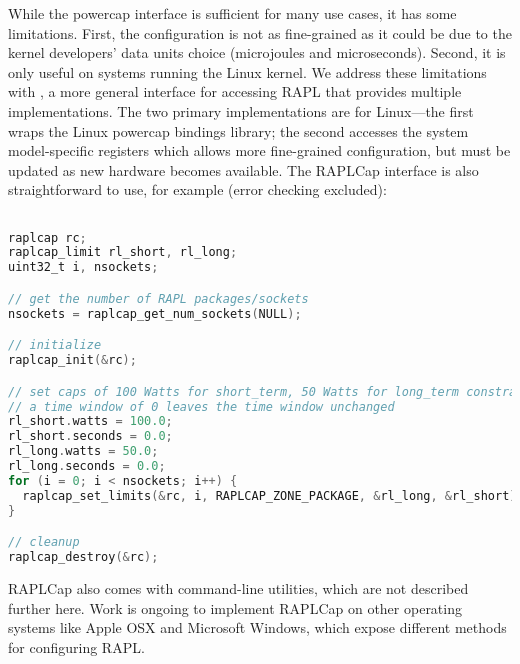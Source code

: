 While the powercap interface is sufficient for many use cases, it has some limitations.
First, the configuration is not as fine-grained as it could be due to the kernel developers' data units choice (microjoules and microseconds).
Second, it is only useful on systems running the Linux kernel.
We address these limitations with , a more general interface for accessing RAPL that provides multiple implementations.
The two primary implementations are for Linux---the first wraps the Linux powercap bindings library; the second accesses the system model-specific registers which allows more fine-grained configuration, but must be updated as new hardware becomes available.
The RAPLCap interface is also straightforward to use, for example (error checking excluded):
%
\begin{lstlisting}[language=C,%
  caption={Setting RAPL power caps with RAPLCap.},%
  morekeywords={uint32_t},%
  label={lst:raplcap-example}]%

raplcap rc;
raplcap_limit rl_short, rl_long;
uint32_t i, nsockets;

// get the number of RAPL packages/sockets
nsockets = raplcap_get_num_sockets(NULL);

// initialize
raplcap_init(&rc);

// set caps of 100 Watts for short_term, 50 Watts for long_term constraints on each socket
// a time window of 0 leaves the time window unchanged
rl_short.watts = 100.0;
rl_short.seconds = 0.0;
rl_long.watts = 50.0;
rl_long.seconds = 0.0;
for (i = 0; i < nsockets; i++) {
  raplcap_set_limits(&rc, i, RAPLCAP_ZONE_PACKAGE, &rl_long, &rl_short);
}

// cleanup
raplcap_destroy(&rc);
\end{lstlisting}
RAPLCap also comes with command-line utilities, which are not described further here.
Work is ongoing to implement RAPLCap on other operating systems like Apple OSX and Microsoft Windows, which expose different methods for configuring RAPL.
